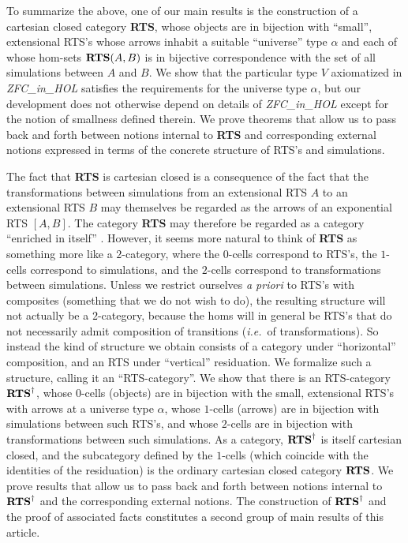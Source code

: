 \documentclass[11pt,notitlepage,a4paper]{report}
\begin{document}
To summarize the above, one of our main results is the construction of a cartesian closed
category {\bf RTS}, whose objects are in bijection with ``small'', extensional RTS's whose
arrows inhabit a suitable ``universe'' type $\alpha$ and each of whose hom-sets ${\bf RTS}(A, B)$
is in bijective correspondence with the set of all simulations between $A$ and $B$.
We show that the particular type $V$ axiomatized in {\em ZFC\_in\_HOL} satisfies the requirements
for the universe type $\alpha$, but our development does not otherwise depend on details of
{\em ZFC\_in\_HOL} except for the notion of smallness defined therein.
We prove theorems that allow us to pass back and forth between notions internal to {\bf RTS}
and corresponding external notions expressed in terms of the concrete structure of
RTS's and simulations.

The fact that {\bf RTS} is cartesian closed is a consequence of the fact that the
transformations between simulations from an extensional RTS $A$ to an extensional RTS $B$
may themselves be regarded as the arrows of an exponential RTS $[A, B]$.
The category {\bf RTS} may therefore be regarded as a category ``enriched in itself''
\cite{kelly-enriched-category}.  However, it seems more natural to think of {\bf RTS}
as something more like a $2$-category, where the $0$-cells correspond to RTS's,
the $1$-cells correspond to simulations, and the $2$-cells correspond to transformations
between simulations.  Unless we restrict ourselves {\em a priori} to RTS's with composites
(something that we do not wish to do), the resulting structure will not actually be
a $2$-category, because the homs will in general be RTS's that do not necessarily
admit composition of transitions ({\em i.e.}~of transformations).
So instead the kind of structure we obtain consists of a category under ``horizontal''
composition, and an RTS under ``vertical'' residuation.
We formalize such a structure, calling it an ``RTS-category''.
We show that there is an RTS-category ${\bf RTS}^\dag$, whose $0$-cells (objects) are in
bijection with the small, extensional RTS's with arrows at a universe type $\alpha$,
whose $1$-cells (arrows) are in bijection with simulations between such RTS's,
and whose $2$-cells are in bijection with transformations between such simulations.
As a category, ${\bf RTS}^\dag$ is itself cartesian closed, and the subcategory defined
by the $1$-cells (which coincide with the identities of the residuation) is the
ordinary cartesian closed category ${\bf RTS}$.
We prove results that allow us to pass back and forth between notions
internal to ${\bf RTS}^\dag$ and the corresponding external notions.
The construction of ${\bf RTS}^\dag$ and the proof of associated facts constitutes a second
group of main results of this article.
\end{document}

